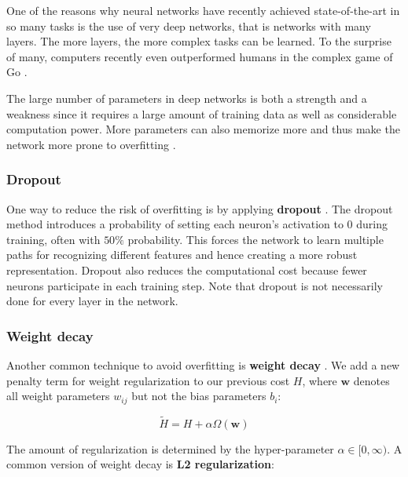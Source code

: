 One of the reasons why neural networks have recently achieved state-of-the-art in so many tasks is the use of very deep networks, that is networks with many layers.
The more layers, the more complex tasks can be learned. To the surprise of many, computers recently even outperformed humans in the complex game of Go \cite{AlphaGo, AlphaGoTuringTest}.

The large number of parameters in deep networks is both a strength and a weakness since it requires a large amount of training data as well as considerable computation power. More parameters can also memorize more and thus make the network more prone to overfitting \cite{AlexNet}.

\subsubsection{Dropout}

One way to reduce the risk of overfitting is by applying \textbf{dropout}  \cite{AlexNet, FornesCnnCategorization}.
The dropout method introduces a probability of setting each neuron's activation to $0$ during training, often with $50\%$ probability. This forces the network to learn multiple paths for recognizing different features and hence creating a more robust representation. Dropout also reduces the computational cost because fewer neurons participate in each training step.
Note that dropout is not necessarily done for every layer in the network.


\subsubsection{Weight decay}

Another common technique to avoid overfitting is \textbf{weight decay} \cite[Chapter~3]{NielsenBook} \cite[Chapter~7]{GoodfellowBook}. We add a new penalty term for weight regularization to our previous cost $H$, where $\mathbf{w}$ denotes all weight parameters $w_{ij}$ but not the bias parameters $b_i$:

\[
\tilde{H} = H + \alpha \Omega(\mathbf{w})
\]

The amount of regularization is determined by the hyper-parameter $\alpha \in [0,\infty)$.
A common version of weight decay is \textbf{L2 regularization}:

